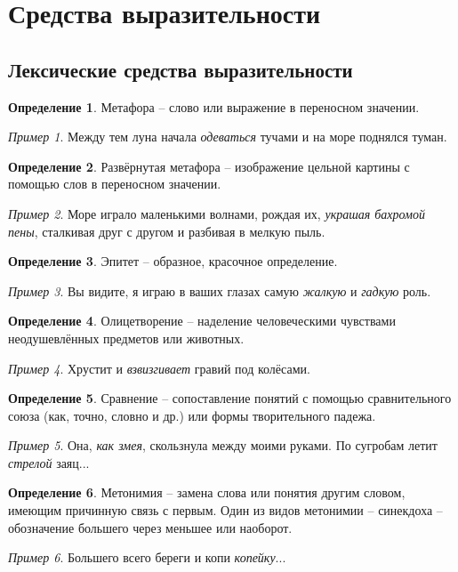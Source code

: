 \documentclass[12pt]{article}
\theoremstyle{definition}
\newtheorem{definition}{Определение}
\theoremstyle{remark}
\newtheorem*{example}{Пример}
\begin{document}
\section{Средства выразительности}

\subsection{Лексические средства выразительности}

\begin{definition}
    Метафора -- слово или выражение в переносном значении.
    \begin{example}
        Между тем луна начала \textsl{одеваться} тучами и на море поднялся туман.
    \end{example}
\end{definition}
\begin{definition}
    Развёрнутая метафора -- изображение цельной картины с помощью слов в переносном значении.
    \begin{example}
        Море играло маленькими волнами, рождая их, \textsl{украшая бахромой пены}, сталкивая друг с другом и разбивая в мелкую пыль.
    \end{example}
\end{definition}
\begin{definition}
    Эпитет -- образное, красочное определение.
    \begin{example}
        Вы видите, я играю в ваших глазах самую \textsl{жалкую} и \textsl{гадкую} роль.
    \end{example}
\end{definition}
\begin{definition}
    Олицетворение -- наделение человеческими чувствами неодушевлённых предметов или животных.
    \begin{example}
        Хрустит и \textsl{взвизгивает} гравий под колёсами.
    \end{example}
\end{definition}
\begin{definition}
    Сравнение -- сопоставление понятий с помощью сравнительного союза (как, точно, словно и др.) или формы творительного падежа.
    \begin{example}
        Она, \textsl{как змея}, скользнула между моими руками. По сугробам летит \textsl{стрелой} заяц...
    \end{example}
\end{definition}
\begin{definition}
    Метонимия -- замена слова или понятия другим словом, имеющим причинную связь с первым. Один из видов метонимии -- синекдоха -- обозначение большего через меньшее или наоборот.
    \begin{example}
        Большего всего береги и копи \textsl{копейку}...
    \end{example}
\end{definition}
\end{document}
